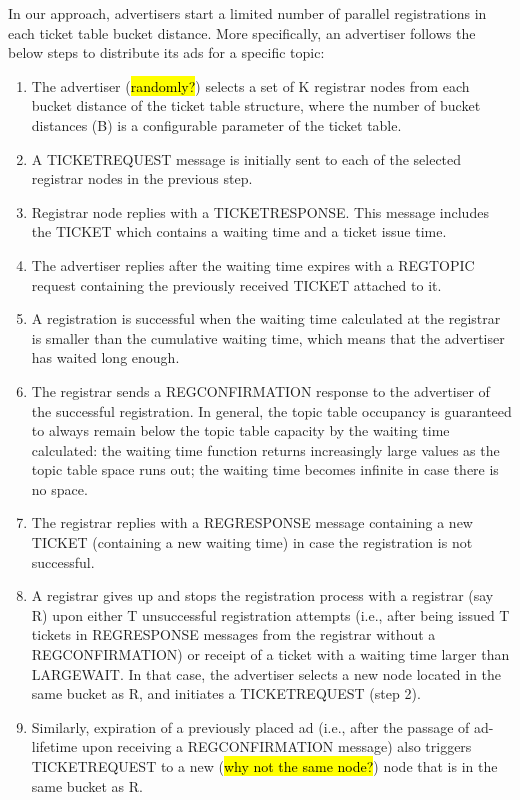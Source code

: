 In our approach, advertisers start a limited number of parallel registrations in each ticket table bucket distance. More specifically, an advertiser follows the below steps to distribute its ads for a specific topic:
\begin{enumerate}
        \item The advertiser (\hl{randomly?}) selects a set of K registrar nodes from each bucket distance of the ticket table structure, where the number of bucket distances (B) is a configurable parameter of the ticket table.
    \item A TICKETREQUEST message is initially sent to each of the selected registrar nodes in the previous step.
    \item Registrar node replies with a TICKETRESPONSE. This message includes the TICKET which contains a waiting time and a ticket issue time.
    \item The advertiser replies after the waiting time expires with a REGTOPIC request containing the previously received TICKET attached to it.
    \item A registration is successful when the waiting time calculated at the registrar is smaller than the cumulative waiting time, which means that the advertiser has waited long enough.
    \item The registrar sends a REGCONFIRMATION response to the advertiser of the successful registration. In general, the topic table occupancy is guaranteed to always remain below the topic table capacity by the waiting time calculated: the waiting time function returns increasingly large values as the topic table space runs out; the waiting time becomes infinite in case there is no space.
    \item The registrar replies with a REGRESPONSE message containing a new TICKET (containing a new waiting time) in case the registration is not successful.
    \item A registrar gives up and stops the registration process with a registrar (say R) upon either T unsuccessful registration attempts (i.e., after being issued T tickets in REGRESPONSE messages from the registrar without a REGCONFIRMATION) or receipt of a ticket with a waiting time larger than LARGEWAIT. In that case, the advertiser selects a new node located in the same bucket as R, and initiates a TICKETREQUEST (step 2).
    \item Similarly, expiration of a previously placed ad (i.e., after the passage of ad-lifetime upon receiving a REGCONFIRMATION message) also triggers TICKETREQUEST to a new (\hl{why not the same node?}) node that is in the same bucket as R.
\end{enumerate}

